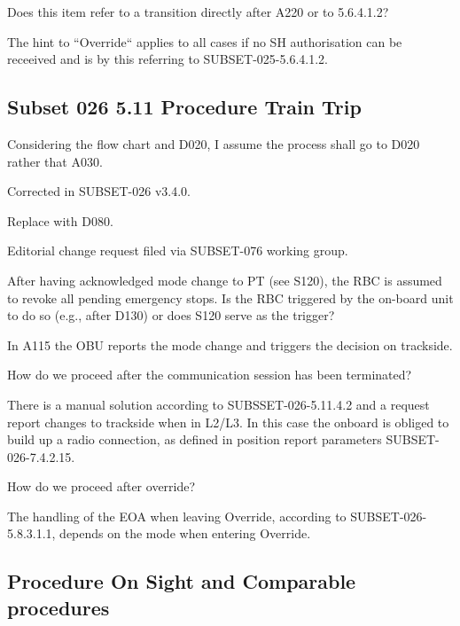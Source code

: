 \documentclass{template/openetcs_article}
\begin{document}
Does this item refer to a transition directly after A220 or to 5.6.4.1.2?

\resolution The hint to ``Override`` applies to all cases if no SH authorisation can be receeived and is by this referring to SUBSET-025-5.6.4.1.2.




\subsection{Subset 026 5.11 Procedure Train Trip}

Considering the flow chart and D020, I assume the process shall go to D020 rather that A030.

\resolution Corrected in SUBSET-026 v3.4.0.

Replace with D080.

\resolution Editorial change request filed via SUBSET-076 working group.

After having acknowledged mode change to PT (see S120), the RBC is assumed to revoke all pending emergency stops. Is the RBC triggered by the on-board unit to do so (e.g., after D130) or does S120 serve as the trigger?

\resolution In A115 the OBU reports the mode change and triggers the decision on trackside.

How do we proceed after the communication session has been terminated?

\resolution There is a manual solution according to SUBSSET-026-5.11.4.2 and a request report changes to trackside when in L2/L3. In this case the onboard is obliged to build up a radio connection, as defined in position report parameters SUBSET-026-7.4.2.15.

How do we proceed after override?

\resolution The handling of the EOA when leaving Override, according to SUBSET-026-5.8.3.1.1, depends on the mode when entering Override.

\subsection{Procedure On Sight and Comparable procedures}
\end{document}
